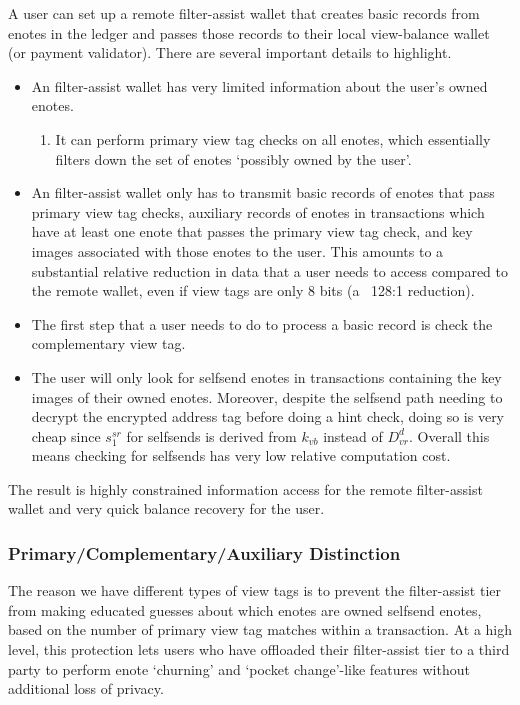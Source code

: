A user can set up a remote filter-assist wallet that creates basic records from enotes in the ledger and passes those records to their local view-balance wallet (or payment validator). There are several important details to highlight.
\begin{itemize}
    \item An filter-assist wallet has very limited information about the user's owned enotes.
    \begin{enumerate}
        \item It can perform primary view tag checks on all enotes, which essentially filters down the set of enotes `possibly owned by the user'.
    \end{enumerate}

    \item An filter-assist wallet only has to transmit basic records of enotes that pass primary view tag checks, auxiliary records of enotes in transactions which have at least one enote that passes the primary view tag check, and key images associated with those enotes to the user. This amounts to a substantial relative reduction in data that a user needs to access compared to the remote wallet, even if view tags are only 8 bits (a ~128:1 reduction).

    \item The first step that a user needs to do to process a basic record is check the complementary view tag.

    \item The user will only look for selfsend enotes in transactions containing the key images of their owned enotes. Moreover, despite the selfsend path needing to decrypt the encrypted address tag before doing a hint check, doing so is very cheap since $s^{sr}_1$ for selfsends is derived from $k_{vb}$ instead of $D^d_{vr}$. Overall this means checking for selfsends has very low relative computation cost.
\end{itemize}

The result is highly constrained information access for the remote filter-assist wallet and very quick balance recovery for the user.

\subsubsection{Primary/Complementary/Auxiliary Distinction}
\label{subsubsec:jamtis-wallets-view-tag-distinction}

The reason we have different types of view tags is to prevent the filter-assist tier from making educated guesses about which enotes are owned selfsend enotes, based on the number of primary view tag matches within a transaction. At a high level, this protection lets users who have offloaded their filter-assist tier to a third party to perform enote `churning' and `pocket change'-like features without additional loss of privacy.

